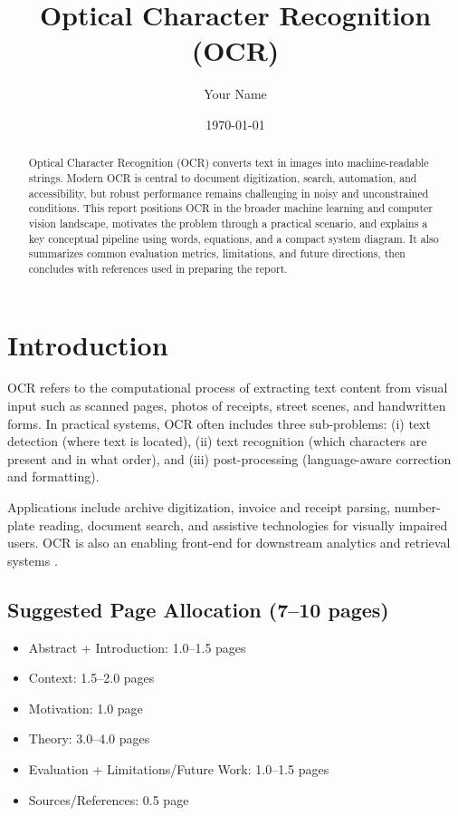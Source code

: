 \documentclass[11pt]{article}
\title{Optical Character Recognition (OCR)}
\author{Your Name}
\date{\today}
\begin{document}
\maketitle

\begin{abstract}
Optical Character Recognition (OCR) converts text in images into machine-readable strings. Modern OCR is central to document digitization, search, automation, and accessibility, but robust performance remains challenging in noisy and unconstrained conditions. This report positions OCR in the broader machine learning and computer vision landscape, motivates the problem through a practical scenario, and explains a key conceptual pipeline using words, equations, and a compact system diagram. It also summarizes common evaluation metrics, limitations, and future directions, then concludes with references used in preparing the report.
\end{abstract}

\section{Introduction}
OCR refers to the computational process of extracting text content from visual input such as scanned pages, photos of receipts, street scenes, and handwritten forms. In practical systems, OCR often includes three sub-problems: (i) text detection (where text is located), (ii) text recognition (which characters are present and in what order), and (iii) post-processing (language-aware correction and formatting).

Applications include archive digitization, invoice and receipt parsing, number-plate reading, document search, and assistive technologies for visually impaired users. OCR is also an enabling front-end for downstream analytics and retrieval systems \cite{smith2007tesseract,mori1999ocrsurvey}.

\subsection{Suggested Page Allocation (7--10 pages)}
\begin{itemize}[leftmargin=*]
    \item Abstract + Introduction: 1.0--1.5 pages
    \item Context: 1.5--2.0 pages
    \item Motivation: 1.0 page
    \item Theory: 3.0--4.0 pages
    \item Evaluation + Limitations/Future Work: 1.0--1.5 pages
    \item Sources/References: 0.5 page
\end{itemize}
\end{document}
